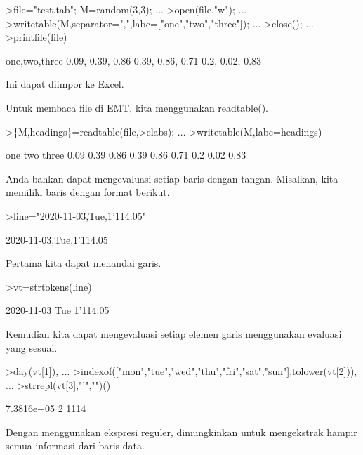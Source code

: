 \documentclass[a4paper,10pt]{article}
\begin{document}
\begin{eulernotebook}
\begin{eulercomment}
\begin{eulercomment}
\begin{eulercomment}
\begin{eulercomment}
\begin{eulercomment}
\begin{eulercomment}
\begin{eulerprompt}
>file="test.tab"; M=random(3,3);  ...
>open(file,"w");  ...
>writetable(M,separator=",",labc=["one","two","three"]);  ...
>close(); ...
>printfile(file)
\end{eulerprompt}
\begin{euleroutput}
  one,two,three
        0.09,      0.39,      0.86
        0.39,      0.86,      0.71
         0.2,      0.02,      0.83
\end{euleroutput}
\begin{eulercomment}
Ini dapat diimpor ke Excel.

Untuk membaca file di EMT, kita menggunakan readtable().
\end{eulercomment}
\begin{eulerprompt}
>\{M,headings\}=readtable(file,>clabs); ...
>writetable(M,labc=headings)
\end{eulerprompt}
\begin{euleroutput}
         one       two     three
        0.09      0.39      0.86
        0.39      0.86      0.71
         0.2      0.02      0.83
\end{euleroutput}
\begin{eulercomment}
Anda bahkan dapat mengevaluasi setiap baris dengan tangan. Misalkan,
kita memiliki baris dengan format berikut.
\end{eulercomment}
\begin{eulerprompt}
>line="2020-11-03,Tue,1'114.05"
\end{eulerprompt}
\begin{euleroutput}
  2020-11-03,Tue,1'114.05
\end{euleroutput}
\begin{eulercomment}
Pertama kita dapat menandai garis.
\end{eulercomment}
\begin{eulerprompt}
>vt=strtokens(line)
\end{eulerprompt}
\begin{euleroutput}
  2020-11-03
  Tue
  1'114.05
\end{euleroutput}
\begin{eulercomment}
Kemudian kita dapat mengevaluasi setiap elemen garis menggunakan
evaluasi yang sesuai.
\end{eulercomment}
\begin{eulerprompt}
>day(vt[1]),  ...
>indexof(["mon","tue","wed","thu","fri","sat","sun"],tolower(vt[2])),  ...
>strrepl(vt[3],"'","")()
\end{eulerprompt}
\begin{euleroutput}
  7.3816e+05
  2
  1114
\end{euleroutput}
\begin{eulercomment}
Dengan menggunakan ekspresi reguler, dimungkinkan untuk mengekstrak
hampir semua informasi dari baris data.


\end{eulercomment}
\end{eulercomment}
\end{eulercomment}
\end{eulercomment}
\end{eulercomment}
\end{eulercomment}
\end{eulercomment}
\end{eulernotebook}
\end{document}
